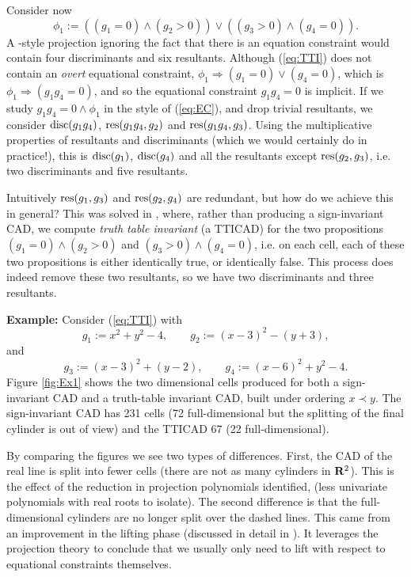 \documentclass[runningheads,a4paper]{llncs}
\begin{document}
\par Consider now
\begin{equation}\label{eq:TTI}
\phi_1:=\left((g_1=0)\land(g_2>0)\right)\lor\left((g_3>0)\land(g_4=0)\right).
\end{equation}
A \cite{McCallum1984}-style projection ignoring the fact that there is an equation constraint would contain four discriminants  and six resultants.
Although (\ref{eq:TTI}) does not contain an \emph{overt} equational constraint,  $\phi_1\Rightarrow(g_1=0)\lor(g_4=0)$, which is $\phi_1\Rightarrow(g_1g_4=0)$, and so the equational constraint $g_1g_4=0$ is implicit. If we study $g_1g_4=0\land\phi_1$ in the style of (\ref{eq:EC}), and drop trivial resultants, we consider $\mathop{\rm disc}\nolimits(g_1g_4)$, $\mathop{\rm res}\nolimits(g_1g_4,g_2)$ and  $\mathop{\rm res}\nolimits(g_1g_4,g_3)$. Using the multiplicative properties of resultants and discriminants (which we would certainly do in practice!), this is $\mathop{\rm disc}\nolimits(g_1)$, $\mathop{\rm disc}\nolimits(g_4)$ and all the resultants except $\mathop{\rm res}\nolimits(g_2,g_3)$, i.e. two discriminants and five resultants.
\par
Intuitively $\mathop{\rm res}\nolimits(g_1,g_3)$ and $\mathop{\rm res}\nolimits(g_2,g_4)$ are redundant, but how do we achieve this in general? This was solved in \cite{Bradfordetal2013b}, where, rather than producing a sign-invariant CAD, we compute  \emph{truth table invariant} (a TTICAD) for the two propositions $(g_1=0)\land(g_2>0)$ and $(g_3>0)\land(g_4=0)$, i.e. on each cell, each of these two propositions is either identically true, or identically false. This process does indeed remove these two resultants, so we have two discriminants and three resultants.

\vspace*{0.1in}

\noindent \textbf{Example:}  Consider (\ref{eq:TTI}) with 
\[
g_1 := x^2+y^2-4, \qquad g_2 := (x-3)^2-(y+3),
\]
and
\[
g_3 := (x-3)^2+(y-2),  \qquad g_4 := (x-6)^2+y^2-4.
\]
Figure \ref{fig:Ex1} shows the two dimensional cells produced for both a sign-invariant CAD and a truth-table invariant CAD, built under ordering $x \prec y$.
The sign-invariant CAD has 231 cells (72 full-dimensional but the splitting of the final cylinder is out of view) and the TTICAD 67 (22 full-dimensional).

By comparing the figures we see two types of differences.  First, the CAD of the real line is split into fewer cells (there are not as many cylinders in ${\mathbf R}^2$).  This is the effect of the reduction in projection polynomials identified, (less univariate polynomials with real roots to isolate).  The second difference is that the full-dimensional cylinders are no longer split over the dashed lines. This came from an improvement in the lifting phase (discussed in detail in \cite{Bradfordetal2014a}).  It leverages the projection theory to conclude that we usually only need to lift with respect to equational constraints themselves.
\end{document}
